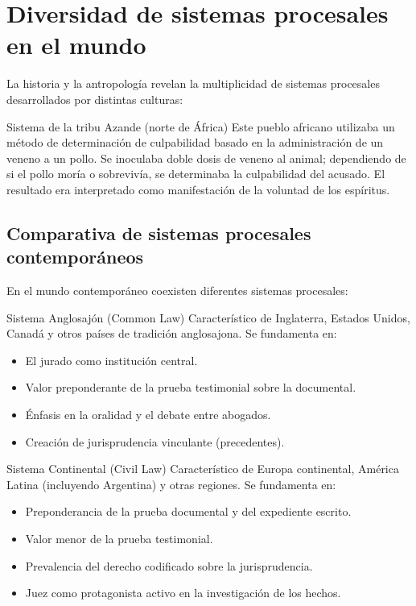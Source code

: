 \documentclass[12pt,oneside]{book}
\begin{document}
\section{Diversidad de sistemas procesales en el mundo}

La historia y la antropología revelan la multiplicidad de sistemas procesales desarrollados por distintas culturas:

\begin{example}{Sistema de la tribu Azande (norte de África)}
Este pueblo africano utilizaba un método de determinación de culpabilidad basado en la administración de un veneno a un pollo. Se inoculaba doble dosis de veneno al animal; dependiendo de si el pollo moría o sobrevivía, se determinaba la culpabilidad del acusado. El resultado era interpretado como manifestación de la voluntad de los espíritus.
\end{example}

\subsection{Comparativa de sistemas procesales contemporáneos}

En el mundo contemporáneo coexisten diferentes sistemas procesales:

\begin{definition}{Sistema Anglosajón (Common Law)}
Característico de Inglaterra, Estados Unidos, Canadá y otros países de tradición anglosajona. Se fundamenta en:
\begin{itemize}
    \item El jurado como institución central.
    \item Valor preponderante de la prueba testimonial sobre la documental.
    \item Énfasis en la oralidad y el debate entre abogados.
    \item Creación de jurisprudencia vinculante (precedentes).
\end{itemize}
\end{definition}

\begin{definition}{Sistema Continental (Civil Law)}
Característico de Europa continental, América Latina (incluyendo Argentina) y otras regiones. Se fundamenta en:
\begin{itemize}
    \item Preponderancia de la prueba documental y del expediente escrito.
    \item Valor menor de la prueba testimonial.
    \item Prevalencia del derecho codificado sobre la jurisprudencia.
    \item Juez como protagonista activo en la investigación de los hechos.
\end{itemize}
\end{definition}
\end{document}
